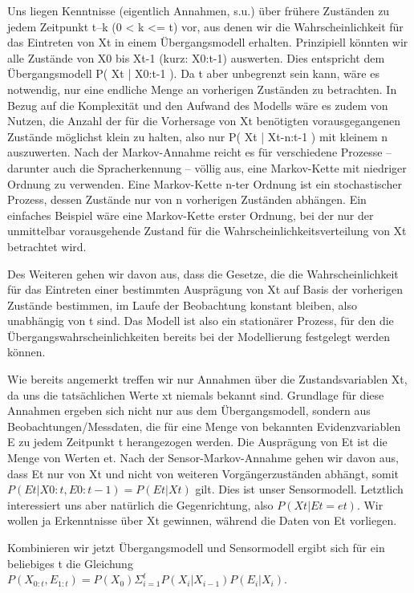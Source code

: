 Uns liegen Kenntnisse (eigentlich Annahmen, s.u.) über frühere Zuständen zu jedem Zeitpunkt t–k (0 < k <= t) vor, aus denen wir die Wahrscheinlichkeit für das Eintreten von Xt in einem Übergangsmodell erhalten.
Prinzipiell könnten wir alle Zustände von X0 bis Xt-1 (kurz: X0:t-1) auswerten.
Dies entspricht dem Übergangsmodell P( Xt | X0:t-1 ).
Da t aber unbegrenzt sein kann, wäre es notwendig, nur eine endliche Menge an vorherigen Zuständen zu betrachten.
In Bezug auf die Komplexität und den Aufwand des Modells wäre es zudem von Nutzen, die Anzahl der für die Vorhersage von Xt benötigten vorausgegangenen Zustände möglichst klein zu halten, also nur P( Xt | Xt-n:t-1 ) mit kleinem n auszuwerten.
Nach der Markov-Annahme reicht es für verschiedene Prozesse – darunter auch die Spracherkennung – völlig aus, eine Markov-Kette mit niedriger Ordnung zu verwenden.
Eine Markov-Kette n-ter Ordnung ist ein stochastischer Prozess, dessen Zustände nur von n vorherigen Zuständen abhängen.
Ein einfaches Beispiel wäre eine Markov-Kette erster Ordnung, bei der nur der unmittelbar vorausgehende Zustand für die Wahrscheinlichkeitsverteilung von Xt betrachtet wird.


Des Weiteren gehen wir davon aus, dass die Gesetze, die die Wahrscheinlichkeit für das Eintreten einer bestimmten Ausprägung von Xt auf Basis der vorherigen Zustände bestimmen, im Laufe der Beobachtung konstant bleiben, also unabhängig von t sind.
Das Modell ist also ein stationärer Prozess, für den die Übergangswahrscheinlichkeiten bereits bei der Modellierung festgelegt werden können.

Wie bereits angemerkt treffen wir nur Annahmen über die Zustandsvariablen Xt, da uns die tatsächlichen Werte xt niemals bekannt sind.
Grundlage für diese Annahmen ergeben sich nicht nur aus dem Übergangsmodell, sondern aus Beobachtungen/Messdaten, die für eine Menge von bekannten Evidenzvariablen E zu jedem Zeitpunkt t herangezogen werden.
Die Ausprägung von Et ist die Menge von Werten et.
Nach der Sensor-Markov-Annahme gehen wir davon aus, dass Et nur von Xt und nicht von weiteren Vorgängerzuständen abhängt, somit $P( Et | X0:t, E0:t-1 ) = P( Et | Xt )$ gilt.
Dies ist unser Sensormodell.
Letztlich interessiert uns aber natürlich die Gegenrichtung, also $P( Xt | Et = et )$.
Wir wollen ja Erkenntnisse über Xt gewinnen, während die Daten von Et vorliegen.

Kombinieren wir jetzt Übergangsmodell und Sensormodell ergibt sich für ein beliebiges t die Gleichung $P(X_{0:t},E_{1:t}) = P(X_0) \Sigma_{i=1}^t P(X_i | X_{i-1}) P(E_i | X_i)$.

